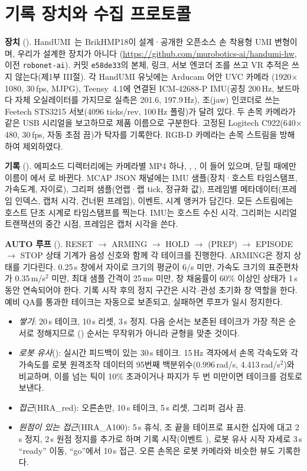 \documentclass[conference,10pt]{IEEEtran}
\begin{document}
\section{기록 장치와 수집 프로토콜}\label{m:sec:rig}
\textbf{장치} (). HandUMI~\cite{handumi_hw}는 BrikHMP18이 설계·공개한 오픈소스 손 착용형 UMI 변형이며, 우리가 설계한 장치가 아니다
(\url{https://github.com/murobotics-ai/handumi-hw}, 이전 \texttt{robonet-ai}). 커밋 \texttt{e58de33}의 본체, 링크, 서보 엔코더 조를 쓰고
VR 추적은 쓰지 않는다(제1부 III절). 각 HandUMI 유닛에는 Arducam 어안 UVC 카메라
(1920$\times$1080, 30\,fps, MJPG), Teensy~4.1에 연결된 ICM-42688-P IMU(공칭 200\,Hz, 보드마다 자체 오실레이터를 가지므로 실측은
201.6, 197.9\,Hz), 조(jaw) 인코더로 쓰는 Feetech STS3215 서보(4096 ticks/rev, 100\,Hz 폴링)가 달려 있다. 두 손목 카메라가 같은
USB 시리얼을 보고하므로 제품 이름으로 구분한다. 고정된 Logitech C922(640$\times$480, 30\,fps, 자동 초점 끔)가 탁자를 기록한다.
RGB-D 카메라는 손목 스트림을 방해하여 제외하였다.

\textbf{기록} (). 에피소드 디렉터리에는 카메라별 MP4 하나, , ,
이 들어 있으며, 닫힐 때에만 이름이 에서 로 바뀐다. MCAP JSON 채널에는
IMU 샘플(장치·호스트 타임스탬프, 가속도계, 자이로), 그리퍼 샘플(언랩·랩 tick, 정규화 값), 프레임별 메타데이터(프레임 인덱스,
캡처 시각, 건너뛴 프레임), 이벤트, 시계 앵커가 담긴다. 모든 스트림에는 호스트 단조 시계로 타임스탬프를 찍는다. IMU는 호스트 수신
시각, 그리퍼는 시리얼 트랜잭션의 중간 시점, 프레임은 캡처 시각을 쓴다.

\textbf{AUTO 루프} (). RESET $\to$ ARMING $\to$ HOLD $\to$ (PREP) $\to$ EPISODE $\to$ STOP 상태
기계가 음성 신호와 함께 각 테이크를 진행한다. ARMING은 정지 상태를 기다린다. 0.25\,s 창에서 자이로 크기의 평균이 6\textdegree/s
미만, 가속도 크기의 표준편차가 0.35\,m/s$^2$ 미만, 최대 샘플 간격이 25\,ms 미만, 창 채움률이 60\% 이상인 상태가 1\,s 동안 연속되어야
한다. 기록 시작 후의 정지 구간은 시각--관성 초기화 창 역할을 한다. 예비 QA를 통과한 테이크는 자동으로 보존되고, 실패하면 루프가
일시 정지한다.
\begin{itemize}
\item \emph{쌓기}: 20\,s 테이크, 10\,s 리셋, 3\,s 정지. 다음 순서는 보존된 테이크가 가장 적은 순서로 정해지므로
() 순서는 무작위가 아니라 균형을 맞춘 것이다.
\item \emph{로봇 유사}(): 실시간 피드백이 있는 30\,s 테이크. 15\,Hz 격자에서 손목 각속도와 각가속도를 로봇
원격조작 데이터의 95번째 백분위수(0.996\,rad/s, 4.413\,rad/s$^2$)와 비교하며, 이를 넘는 틱이 10\% 초과이거나 파지가 두 번 미만이면
테이크를 검토로 보낸다.
\item \emph{접근}(HRA\_red): 오른손만, 10\,s 테이크, 5\,s 리셋, 그리퍼 검사 끔.
\item \emph{원점이 있는 접근}(HRA\_A100): 5\,s 휴식, 조 끝을 테이프로 표시한 십자에 대고 2\,s 정지, 2\,s 원점 정지를 추가로 하며
기록 시작(이벤트 ), 로봇 유사 시작 자세로 3\,s ``ready'' 이동, ``go''에서 10\,s 접근. 오른 손목은 로봇 카메라와 비슷한
뷰도 기록한다.
\end{itemize}
\end{document}
